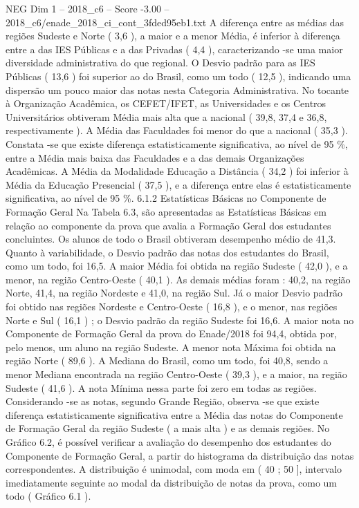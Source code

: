\begin{textsample}{NEG Dim 1 – 2018\_c6 – Score -3.00 – 2018\_c6/enade\_2018\_ci\_cont\_3fded95eb1.txt}
A diferença entre as médias das regiões Sudeste e Norte ( 3,6 ), a maior e a menor Média, é inferior à diferença entre a das IES Públicas e a das Privadas ( 4,4 ), caracterizando -se uma maior diversidade administrativa do que regional.
O Desvio padrão para as IES Públicas ( 13,6 ) foi superior ao do Brasil, como um todo ( 12,5 ), indicando uma dispersão um pouco maior das notas nesta Categoria Administrativa.
No tocante à Organização Acadêmica, os CEFET/IFET, as Universidades e os Centros Universitários obtiveram Média mais alta que a nacional ( 39,8, 37,4 e 36,8, respectivamente ).
A Média das Faculdades foi menor do que a nacional ( 35,3 ).
Constata -se que existe diferença estatisticamente significativa, ao nível de 95 \%, entre a Média mais baixa das Faculdades e a das demais Organizações Acadêmicas.
A Média da Modalidade Educação a Distância ( 34,2 ) foi inferior à Média da Educação Presencial ( 37,5 ), e a diferença entre elas é estatisticamente significativa, ao nível de 95 \%. 6.1.2 Estatísticas Básicas no Componente de Formação Geral Na Tabela 6.3, são apresentadas as Estatísticas Básicas em relação ao componente da prova que avalia a Formação Geral dos estudantes concluintes.
Os alunos de todo o Brasil obtiveram desempenho médio de 41,3.
Quanto à variabilidade, o Desvio padrão das notas dos estudantes do Brasil, como um todo, foi 16,5.
A maior Média foi obtida na região Sudeste ( 42,0 ), e a menor, na região Centro-Oeste ( 40,1 ).
As demais médias foram : 40,2, na região Norte, 41,4, na região Nordeste e 41,0, na região Sul.
Já o maior Desvio padrão foi obtido nas regiões Nordeste e Centro-Oeste ( 16,8 ), e o menor, nas regiões Norte e Sul ( 16,1 ) ; o Desvio padrão da região Sudeste foi 16,6.
A maior nota no Componente de Formação Geral da prova do Enade/2018 foi 94,4, obtida por, pelo menos, um aluno na região Sudeste.
A menor nota Máxima foi obtida na região Norte ( 89,6 ).
A Mediana do Brasil, como um todo, foi 40,8, sendo a menor Mediana encontrada na região Centro-Oeste ( 39,3 ), e a maior, na região Sudeste ( 41,6 ).
A nota Mínima nessa parte foi zero em todas as regiões.
Considerando -se as notas, segundo Grande Região, observa -se que existe diferença estatisticamente significativa entre a Média das notas do Componente de Formação Geral da região Sudeste ( a mais alta ) e as demais regiões.
No Gráfico 6.2, é possível verificar a avaliação do desempenho dos estudantes do Componente de Formação Geral, a partir do histograma da distribuição das notas correspondentes.
A distribuição é unimodal, com moda em ( 40 ; 50 ], intervalo imediatamente seguinte ao modal da distribuição de notas da prova, como um todo ( Gráfico 6.1 ).

\end{textsample}

